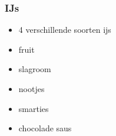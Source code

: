 \subsubsection{IJs}
\begin{itemize}
	\item	4 verschillende soorten  ijs
	\item	fruit
	\item	slagroom
	\item	nootjes
	\item	smarties
	\item	chocolade saus
\end{itemize}
